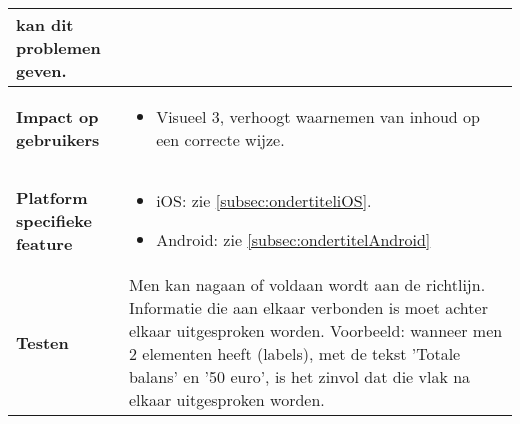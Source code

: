 \begin{table}[H]
\begin{tabular}{|l|p{12cm}|}
        kan dit problemen geven. \\ 
        \hline
        \textbf{Impact op gebruikers}        & 
        \begin{itemize}
            \item Visueel 3, verhoogt waarnemen van inhoud op een correcte wijze.         
        \end{itemize}                                                                                                                   \\ 
        \hline
        \textbf{Platform specifieke feature} & \begin{itemize}
            \item iOS: zie \ref{subsec:ondertiteliOS}.
            \item Android: zie \ref{subsec:ondertitelAndroid}
        \end{itemize}                                                                                                                                                                       \\ 
        
        \hline
        \textbf{Testen}                      & Men kan nagaan of voldaan wordt aan de richtlijn. Informatie die aan elkaar verbonden is moet achter elkaar uitgesproken worden.  Voorbeeld: wanneer men 2 elementen heeft (labels), met de tekst 'Totale balans' en '50 euro', is het zinvol dat die vlak na elkaar uitgesproken worden.                                                                                                                                                     \\
        \hline
    \end{tabular}
\end{table}

